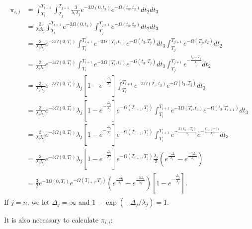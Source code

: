 \documentclass{article}
\begin{document}
\begin{align}
    \begin{split}
        \pi_{i,j} &=
        \int_{T_i}^{T_{i+1}}\int_{T_j}^{T_{j+1}}\frac{3}{\lambda_i\lambda_j}e^{-3\Omega(0,t_3)}e^{-\Omega(t_3,t_2)}dt_2dt_3\\
        &= \frac{3}{\lambda_i\lambda_j}\int_{T_i}^{T_{i+1}}e^{-3\Omega(0,t_3)}\int_{T_j}^{T_{j+1}}e^{-\Omega(t_3,t_2)}dt_2dt_3\\
        &= \frac{3}{\lambda_i\lambda_j}e^{-3\Omega(0,T_i)}\int_{T_i}^{T_{i+1}}e^{-3\Omega(T_i,t_3)}e^{-\Omega(t_3,T_j)}dt_3
            \int_{T_j}^{T_{j+1}}e^{-\Omega(T_j,t_2)}dt_2\\
        &= \frac{3}{\lambda_i\lambda_j}e^{-3\Omega(0,T_i)}\int_{T_i}^{T_{i+1}}e^{-3\Omega(T_i,t_3)}e^{-\Omega(t_3,T_j)}dt_3
            \int_{T_j}^{T_{j+1}}e^{-\frac{t_2-T_j}{\lambda_j}}dt_2\\
        &= \frac{3}{\lambda_i\lambda_j}e^{-3\Omega(0,T_i)}\lambda_j\left[1-e^{-\frac{\Delta_j}{\lambda_j}}\right]
            \int_{T_i}^{T_{i+1}}e^{-3\Omega(T_i,t_3)}e^{-\Omega(t_3,T_j)}dt_3\\
        &= \frac{3}{\lambda_i\lambda_j}e^{-3\Omega(0,T_i)}\lambda_j\left[1-e^{-\frac{\Delta_j}{\lambda_j}}\right]
            e^{-\Omega(T_{i+1},T_j)}
            \int_{T_i}^{T_{i+1}}e^{-3\Omega(T_i,t_3)}e^{-\Omega(t_3,T_{i+1})}dt_3\\
        &= \frac{3}{\lambda_i\lambda_j}e^{-3\Omega(0,T_i)}\lambda_j\left[1-e^{-\frac{\Delta_j}{\lambda_j}}\right]
            e^{-\Omega(T_{i+1},T_j)}
            \int_{T_i}^{T_{i+1}}e^{-\frac{3(t_3-T_i)}{\lambda_i}}e^{-\frac{T_{i+1}-t_3}{\lambda_i}}dt_3\\
        &= \frac{3}{\lambda_i\lambda_j}e^{-3\Omega(0,T_i)}\lambda_j\left[1-e^{-\frac{\Delta_j}{\lambda_j}}\right]
            e^{-\Omega(T_{i+1},T_j)}
            \frac{\lambda_i}{2} \left(e^{\frac{-\Delta_i}{\lambda_i}}-e^{\frac{-3\Delta_i}{\lambda_i}}\right)\\
        &= \frac{3}{2}e^{-3\Omega(0,T_i)}e^{-\Omega(T_{i+1},T_j)}
            \left(e^{\frac{-\Delta_i}{\lambda_i}}-e^{\frac{-3\Delta_i}{\lambda_i}}\right)
            \left[1-e^{-\frac{\Delta_j}{\lambda_j}}\right].
    \end{split}
    \label{eq:pidiscrete}
\end{align}
If $j=n$, we let $\Delta_j = \infty$ and $1-\exp(-\Delta_j/\lambda_j) = 1$.

It is also necessary to calculate $\pi_{i,i}$:
\end{document}
